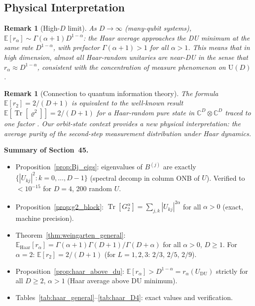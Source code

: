 \documentclass[12pt,a4paper]{article}
\newtheorem{remark}[theorem]{Remark}
\begin{document}
\subsection{Physical Interpretation}
\label{sec:haar_phys}

\begin{remark}[High-$D$ limit]
As $D\to\infty$ (many-qubit systems), $\mathbb{E}[r_\alpha]\sim\Gamma(\alpha+1)D^{1-\alpha}$:
the Haar average approaches the DU minimum at the same rate $D^{1-\alpha}$,
with prefactor $\Gamma(\alpha+1)>1$ for all $\alpha>1$.
This means that in high dimension, \emph{almost all} Haar-random unitaries
are near-DU in the sense that $r_\alpha\approx D^{1-\alpha}$,
consistent with the concentration of measure phenomenon on $\mathrm{U}(D)$.
\end{remark}

\begin{remark}[Connection to quantum information theory]
The formula $\mathbb{E}[r_2]=2/(D+1)$ is equivalent to the
well-known result $\mathbb{E}[\operatorname{Tr}[\varrho^2]]=2/(D+1)$ for a Haar-random pure state
in $\mathbb{C}^D\otimes\mathbb{C}^D$ traced to one factor \cite{page1993}.
Our orbit-state context provides a new physical interpretation:
the average purity of the second-step measurement distribution under Haar dynamics.
\end{remark}

\bigskip
\noindent\textbf{Summary of Section~45.}
\begin{itemize}
\item Proposition~\ref{prop:Bj_eigs}: eigenvalues of $B^{(j)}$ are exactly
  $\{|U_{kj}|^2:k=0,\ldots,D-1\}$ (spectral decomp in column ONB of $U$).
  Verified to $<10^{-15}$ for $D=4$, 200 random $U$.
\item Proposition~\ref{prop:g2_block}: $\operatorname{Tr}[G_2^\alpha]=\sum_{j,k}|U_{kj}|^{2\alpha}$
  for all $\alpha>0$ (exact, machine precision).
\item Theorem~\ref{thm:weingarten_general}: $\mathbb{E}_{\mathrm{Haar}}[r_\alpha]
  =\Gamma(\alpha+1)\Gamma(D+1)/\Gamma(D+\alpha)$ for all $\alpha>0$, $D\geq1$.
  For $\alpha=2$: $\mathbb{E}[r_2]=2/(D+1)$ (for $L=1,2,3$: $2/3$, $2/5$, $2/9$).
\item Proposition~\ref{prop:haar_above_du}: $\mathbb{E}[r_\alpha]>D^{1-\alpha}=r_\alpha(U_{\mathrm{DU}})$
  strictly for all $D\geq2$, $\alpha>1$ (Haar average above DU minimum).
\item Tables~\ref{tab:haar_general}--\ref{tab:haar_D4}: exact values and verification.
\end{itemize}
\end{document}
